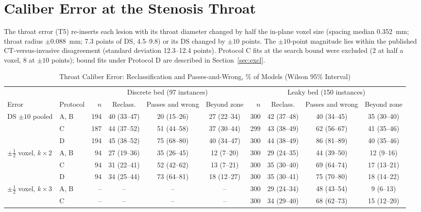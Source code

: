 \documentclass[journal,twoside,web,onecolumn]{ieeecolor}
\begin{document}
\FloatBarrier
{}
\section{Caliber Error at the Stenosis Throat}\label{sec:throat}
The throat error (T5) re-inserts each lesion with its throat diameter changed by half the in-plane voxel size
(spacing median 0.352~mm; throat radius $\pm 0.088$~mm; 7.3 points of DS, 4.5--9.8) or its DS changed by $\pm 10$ points. The $\pm 10$-point magnitude lies within the published CT-versus-invasive disagreement (standard deviation 12.3--12.4 points). Protocol C fits at the search bound were excluded
(2 at half a voxel, 8 at $\pm 10$ points); bound fits under Protocol D are described in Section~\ref{sec:excl}.
\begin{table}[!ht]
\caption{Throat Caliber Error: Reclassification and Passes-and-Wrong, \% of Models (Wilson 95\% Interval)}\label{tab:throat}
\centering\footnotesize\setlength{\tabcolsep}{3pt}
\begin{tabular}{@{}llrccc rccc@{}}
\toprule
 & & \multicolumn{4}{c}{Discrete bed (97 instances)} & \multicolumn{4}{c}{Leaky bed (150 instances)}\\
\cmidrule(lr){3-6}\cmidrule(l){7-10}
Error & Protocol & $n$ & Reclass. & Passes and wrong & Beyond zone & $n$ & Reclass. & Passes and wrong & Beyond zone\\
\midrule
DS $\pm10$ pooled & A, B & 194 & 40 (33--47) & 20 (15--26) & 27 (22--34) & 300 & 42 (37--48) & 40 (34--45) & 35 (30--40) \\
 & C & 187 & 44 (37--52) & 51 (44--58) & 37 (30--44) & 299 & 43 (38--49) & 62 (56--67) & 41 (35--46) \\
 & D & 194 & 45 (38--52) & 75 (68--80) & 40 (34--47) & 300 & 44 (38--49) & 86 (81--89) & 40 (35--46) \\
$\pm\tfrac12$ voxel, $k\times2$ & A, B & 94 & 27 (19--36) & 35 (26--45) & 12 (7--20) & 300 & 29 (24--35) & 44 (39--50) & 12 (9--16) \\
 & C & 94 & 31 (22--41) & 52 (42--62) & 13 (7--21) & 300 & 35 (30--40) & 69 (64--74) & 17 (13--21) \\
 & D & 94 & 34 (25--44) & 73 (64--81) & 18 (12--27) & 300 & 35 (30--41) & 75 (70--80) & 18 (14--22) \\
\addlinespace[2pt]
$\pm\tfrac12$ voxel, $k\times3$ & A, B & -- & -- & -- & -- & 300 & 29 (24--34) & 48 (43--54) & 9 (6--13) \\
 & C & -- & -- & -- & -- & 300 & 34 (29--40) & 68 (62--73) & 15 (12--20) \\

\end{tabular}
\end{table}
\end{document}
